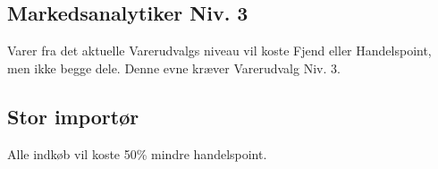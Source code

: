 \subsection{Markedsanalytiker Niv. 3}
Varer fra det aktuelle Varerudvalgs niveau vil koste Fjend eller Handelspoint, men ikke begge dele. Denne evne kræver Varerudvalg Niv. 3.\\

\subsection{Stor importør}
Alle indkøb vil koste 50\% mindre handelspoint.\\



